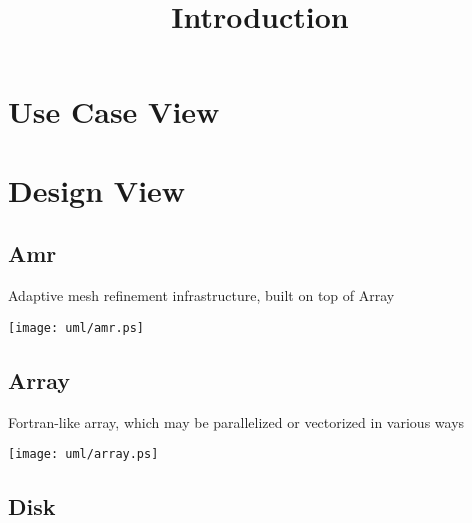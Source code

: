 \documentclass{book}
\begin{document}

\tableofcontents

\title{Introduction} \label{s:intro}


\chapter{Use Case View}

\chapter{Design View}


\section{Amr}

Adaptive mesh refinement infrastructure, built on top of Array

\centerline{\texttt{[image: uml/amr.ps]}}

\section{Array}

Fortran-like array, which may be parallelized or vectorized in various
ways

\centerline{\texttt{[image: uml/array.ps]}}

\section{Disk}
\end{document}

